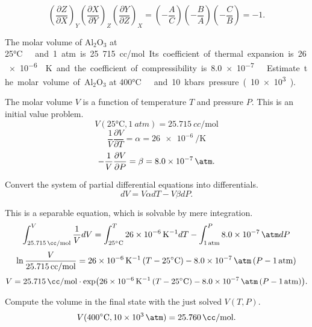 \begin{@empty}
\begin{answer}
    \[
        \left( \frac{\partial Z}{\partial X} \right)_Y
        \left( \frac{\partial X}{\partial Y} \right)_Z
        \left( \frac{\partial Y}{\partial Z} \right)_X
        = \left( -\frac AC \right)
          \left( -\frac BA \right)
          \left( -\frac CB \right)
        = -1.
    \]
\end{answer}

\begin{problem}
    The molar volume of Al$_2$O$_3$ at 25\si\celsius\ and 1 atm is 25.715
    cc/mol.  Its coefficient of thermal expansion is \SI{26e-6}{\per\kelvin}
    and the coefficient of compressibility is \SI{8.0e-7}{\per\atm}.  Estimate
    the molar volume of Al$_2$O$_3$ at 400\si\celsius\ and 10 kbars pressure
    (\SI{10e3}{\atm}).
\end{problem}

\begin{answer}
    \begin{@empty}
        \newcommand{\thisV}{\SI{25.715}{cc/\mol}}
        \newcommand{\thisT}{25\si\celsius}
        \newcommand{\thisP}{\SI{1}{atm}}
        \newcommand{\thisa}{\SI{26e-6}{\per\kelvin}}
        \newcommand{\thisb}{\SI{8.0e-7}{\per\atm}}

        The molar volume $V$ is a function of temperature $T$ and pressure $P$.
        This is an initial value problem.
        \[ V(\thisT, \thisP) = \thisV \]
        \[ \frac1V \frac{\partial V}{\partial T} = \alpha = \thisa \]
        \[ -\frac1V \frac{\partial V}{\partial P} = \beta = \thisb.\]

        Convert the system of partial differential equations into differentials.
        \[ dV = V \alpha dT - V \beta dP.\]

        \newcommand{\varthisV}{\SI[per-mode=fraction]{25.715}{\cc\per\mol}}
        \newcommand{\exponent}{\thisa \left( T - \thisT \right)
            - \thisb \left( P - \thisP \right)}
        This is a separable equation, which is solvable by mere integration.
        \[
            \int_{\varthisV}^V \frac1V dV
            = \int_{\thisT}^T \thisa dT
            - \int_{\thisP}^P \thisb dP
        \]
        \[ \ln \frac{V}{\thisV} = \exponent \]
        \[ V = \varthisV \cdot \exp \Left( \exponent \Right).\]
    \end{@empty}

    Compute the volume in the final state with the just solved $V(T, P)$.
    \[ V(400\si\celsius, \SI{10e3}{\atm}) = \SI{25.760}{\cc/\mol}.\]
\end{answer}


\end{@empty}
